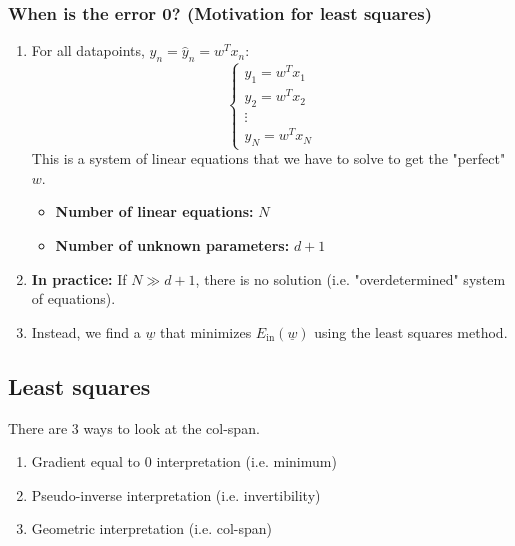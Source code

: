     \subsubsection{When is the error 0? (Motivation for least squares)}
    \begin{intuition}
        \begin{enumerate}

            \item For all datapoints, $y_n = \hat{y}_n = w^T x_n$: \\
            \[
            \begin{cases}
            y_1 = w^T x_1 \\
            y_2 = w^T x_2 \\
            \vdots \\
            y_N = w^T x_N
            \end{cases}
            \]
            This is a system of linear equations that we have to solve to get the "perfect" \( w \).
        
            \begin{itemize}
                \item \textbf{Number of linear equations:} $N$ 
                \item \textbf{Number of unknown parameters:} $d+1$
            \end{itemize}
        
            \item \textbf{In practice:} If $N \gg d+1$, there is no solution (i.e. "overdetermined" system of equations).
        
            \item Instead, we find a $\underline{w}$ that minimizes $E_{\text{in}}(\underline{w})$ using the least squares method.
        
        \end{enumerate}
    \end{intuition}

\subsection{Least squares}
    \begin{intuition}
        There are 3 ways to look at the col-span.
        \begin{enumerate}
            \item Gradient equal to 0 interpretation (i.e. minimum)
            \item Pseudo-inverse interpretation (i.e. invertibility)
            \item Geometric interpretation (i.e. col-span)
        \end{enumerate}
    \end{intuition}
